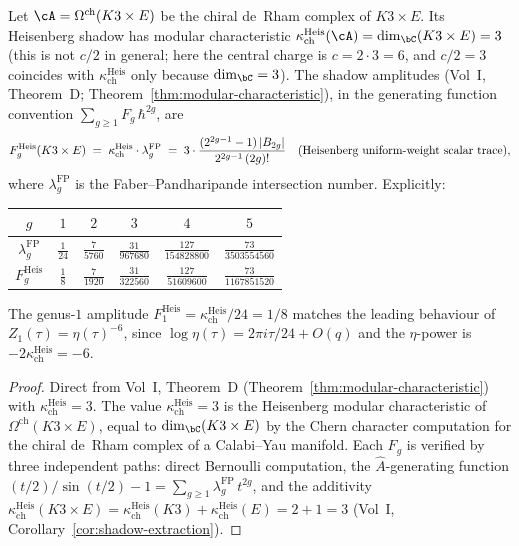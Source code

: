 \begin{proposition}
\label{prop:shadow-k3e}
Let $\cA = \Omega^{\mathrm{ch}}(K3 \times E)$ be the chiral
de~Rham complex of $K3 \times E$. Its Heisenberg shadow has
modular characteristic
$\kappa_{\mathrm{ch}}^{\mathrm{Heis}}(\cA) = \dim_\bC(K3 \times E) = 3$
\textup{(}this is not $c/2$ in general; here the central charge is
$c = 2 \cdot 3 = 6$, and $c/2 = 3$ coincides with $\kappa_{\mathrm{ch}}^{\mathrm{Heis}}$
only because $\dim_\bC = 3$\textup{)}.
The shadow amplitudes \textup{(}Vol~I, Theorem~D;
Theorem~\textup{\ref{thm:modular-characteristic})}, in the
generating function convention $\sum_{g \geq 1} F_g\,\hbar^{2g}$,
are
\begin{equation}\label{eq:shadow-k3e}
F_g^{\mathrm{Heis}}(K3 \times E) \;=\; \kappa_{\mathrm{ch}}^{\mathrm{Heis}} \cdot \lambda_g^{\mathrm{FP}}
\;=\; 3 \cdot \frac{(2^{2g-1}-1)\,|B_{2g}|}{2^{2g-1}\,(2g)!}
\quad \textup{(Heisenberg uniform-weight scalar trace)},
\end{equation}
where $\lambda_g^{\mathrm{FP}}$ is the Faber--Pandharipande
intersection number. Explicitly:
\begin{center}
\small
\renewcommand{\arraystretch}{1.2}
\begin{tabular}{cccccc}
$g$ & $1$ & $2$ & $3$ & $4$ & $5$ \\
\hline
$\lambda_g^{\mathrm{FP}}$ & $\frac{1}{24}$ & $\frac{7}{5760}$
 & $\frac{31}{967680}$ & $\frac{127}{154828800}$
 & $\frac{73}{3503554560}$ \\[4pt]
$F_g^{\mathrm{Heis}}$ & $\frac{1}{8}$ & $\frac{7}{1920}$
 & $\frac{31}{322560}$ & $\frac{127}{51609600}$
 & $\frac{73}{1167851520}$
\end{tabular}
\end{center}
The genus-$1$ amplitude
$F_1^{\mathrm{Heis}} = \kappa_{\mathrm{ch}}^{\mathrm{Heis}}/24 = 1/8$
matches the
leading behaviour of $Z_1(\tau) = \eta(\tau)^{-6}$, since
$\log\eta(\tau) = 2\pi i \tau / 24 + O(q)$ and the
$\eta$-power is $-2\kappa_{\mathrm{ch}}^{\mathrm{Heis}} = -6$.
\end{proposition}

\begin{proof}
Direct from Vol~I, Theorem~D
(Theorem~\ref{thm:modular-characteristic})
with $\kappa_{\mathrm{ch}}^{\mathrm{Heis}} = 3$. The value
$\kappa_{\mathrm{ch}}^{\mathrm{Heis}} = 3$ is the Heisenberg modular
characteristic of $\Omega^{\mathrm{ch}}(K3 \times E)$,
equal to $\dim_\bC(K3 \times E)$ by the Chern character
computation for the chiral de~Rham complex of a Calabi--Yau
manifold. Each $F_g$ is verified by three independent
paths: direct Bernoulli computation, the $\hat{A}$-generating
function $(t/2)/\sin(t/2) - 1 = \sum_{g \geq 1}
\lambda_g^{\mathrm{FP}}\,t^{2g}$, and the additivity
$\kappa_{\mathrm{ch}}^{\mathrm{Heis}}(K3 \times E) = \kappa_{\mathrm{ch}}^{\mathrm{Heis}}(K3) + \kappa_{\mathrm{ch}}^{\mathrm{Heis}}(E) = 2 + 1 = 3$
(Vol~I, Corollary~\ref{cor:shadow-extraction}).
\end{proof}


